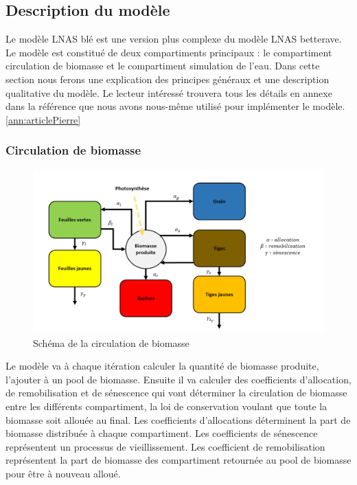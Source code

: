 \subsection{Description du modèle}

Le modèle LNAS blé est une version plus complexe du modèle LNAS betterave. Le modèle est constitué de deux compartiments principaux : le compartiment circulation de biomasse et le compartiment simulation de l'eau. Dans cette section nous ferons une explication des principes généraux et une description qualitative du modèle. Le lecteur intéressé trouvera tous les détails en annexe dans  la référence que nous avons nous-même utilisé pour implémenter le modèle. \ref{ann:articlePierre}

\subsubsection{Circulation de biomasse}

\begin{figure}

\begin{center}
 \includegraphics[scale = 0.5]{./img/modelSchema.png}
 \caption{Schéma de la circulation de biomasse}
 \label{fig:schemaModel}
\end{center}

\end{figure}

Le modèle va à chaque itération calculer la quantité de biomasse produite, l'ajouter à un pool de biomasse. Ensuite il va calculer des coefficients d'allocation, de remobilisation et de sénescence qui vont déterminer la circulation de biomasse entre les différents compartiment, la loi de conservation voulant que toute la biomasse soit allouée au final. Les coefficients d'allocations déterminent la part de biomasse distribuée à chaque compartiment. Les coefficients de sénescence représentent un processus de vieillissement. Les coefficient de remobilisation représentent la part de biomasse des compartiment retournée au pool de biomasse pour être à nouveau alloué.

